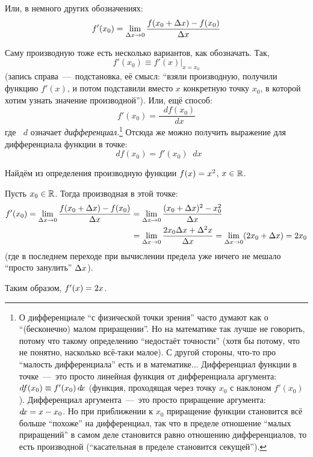 \documentclass[a4paper,12pt]{article}
\newcommand{\diff}{\mathop{}\!d\!}
\begin{document}
  Или, в немного других обозначениях:
  \[
    f'(x_0) = \lim_{\Delta x \to 0} \frac{f(x_0 + \Delta x) - f(x_0)}{\Delta x}
  \]
  
  Саму производную тоже есть несколько вариантов, как обозначать.
  Так,
  \[
    f'(x_0) \equiv f'(x)|_{x = x_0}
  \]
  (запись справа~---~подстановка, её смысл: ``взяли производную, получили функцию $f'(x)$, и потом подставили вместо $x$ конкретную точку $x_0$, в которой хотим узнать значение производной'').
  Или, ещё способ:
  \[
    f'(x_0) = \frac{\diff f(x_0)}{\diff x}
  \]
  где $\diff$ означает \emph{дифференциал}.\footnote{
    О дифференциале ``с физической точки зрения'' часто думают как о ``(бесконечно) малом приращении''.
    Но на математике так лучше не говорить, потому что такому определению ``недостаёт точности'' (хотя бы потому, что не понятно, насколько всё-таки малое). %
    С другой стороны, что-то про ``малость дифференциала'' есть и в математике...
    Дифференциал функции в точке~---~это просто линейная функция от дифференциала аргумента: $\diff f(x_0) \hm\equiv f'(x_0) \diff x$ (функция, проходящая через точку $x_0$ с наклоном $f'(x_0)$).
    Дифференциал аргумента~---~это просто приращение аргумента: $\diff x \hm= x \hm- x_0$.
    Но при приближении к $x_0$ приращение функции становится всё больше ``похоже'' на дифференциал, так что в пределе отношение ``малых приращений'' в самом деле становится равно отношению дифференциалов, то есть производной (``касательная в пределе становится секущей'').
  }
  Отсюда же можно получить выражение для дифференциала функции в точке:
  \[
    \diff f(x_0) = f'(x_0) \diff x
  \]
  
  \begin{example}
    Найдём из определения производную функции $f(x) \hm= x^2$, $x \hm\in \RR$.
    
    Пусть $x_0 \hm\in \RR$.
    Тогда производная в этой точке:
    \begin{equation*}
    \begin{split}
      f'(x_0) = \lim_{\Delta x \to 0} \frac{f(x_0 + \Delta x) - f(x_0)}{\Delta x}
        &= \lim_{\Delta x \to 0} \frac{(x_0 + \Delta x)^2 - x_0^2}{\Delta x}\\
        &= \lim_{\Delta x \to 0} \frac{2 x_0 \Delta x + \Delta^2 x}{\Delta x}
        = \lim_{\Delta x \to 0} (2 x_0 + \Delta x)
        = 2 x_0
    \end{split}
    \end{equation*}
    (где в последнем переходе при вычислении предела уже ничего не мешало ``просто занулить'' $\Delta x$).
    
    Таким образом, $f'(x) \hm= 2x$.
  \end{example}
  
\end{document}
